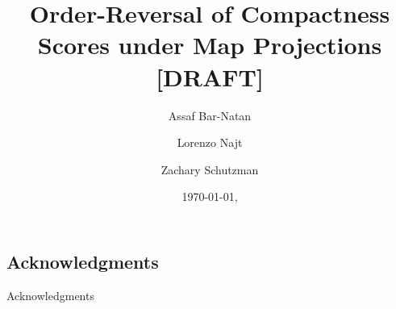 \documentclass{article}
\title{Order-Reversal of Compactness Scores under Map Projections [DRAFT]}
\date{\today, \currenttime}
\author{Assaf Bar-Natan \and Lorenzo Najt \and Zachary Schutzman }
\theoremstyle{definition}
\theoremstyle{remark}
\begin{document}
\maketitle
\begin{abstract}

\end{abstract}
\ifarxiv
\else
\fi









%








\ifarxiv
\subsection*{Acknowledgments}


\else

\begin{acknowledgment}{Acknowledgments}

\end{acknowledgment}
\fi





%
\end{document}
